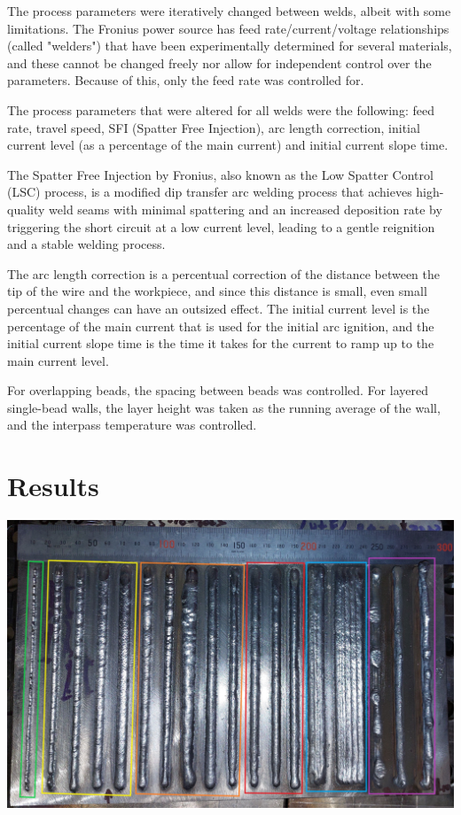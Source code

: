 The process parameters were iteratively changed between welds, albeit with some limitations. The Fronius power source has feed rate/current/voltage relationships (called "welders") that have been experimentally determined for several materials, and these cannot be changed freely nor allow for independent control over the parameters. Because of this, only the feed rate was controlled for.

The process parameters that were altered for all welds were the following: feed rate, travel speed, SFI (Spatter Free Injection), arc length correction, initial current level (as a percentage of the main current) and initial current slope time.

The Spatter Free Injection by Fronius, also known as the Low Spatter Control (LSC) process, is a modified dip transfer arc welding process that achieves high-quality weld seams with minimal spattering and an increased deposition rate by triggering the short circuit at a low current level, leading to a gentle reignition and a stable welding process.

The arc length correction is a percentual correction of the distance between the tip of the wire and the workpiece, and since this distance is small, even small percentual changes can have an outsized effect. The initial current level is the percentage of the main current that is used for the initial arc ignition, and the initial current slope time is the time it takes for the current to ramp up to the main current level.

For overlapping beads, the spacing between beads was controlled. For layered single-bead walls, the layer height was taken as the running average of the wall, and the interpass temperature was controlled.


\section{Results}

\begin{minipage}{\linewidth}
    \centering
    \includegraphics[width=\linewidth]{images/all_welds_boxes.jpg}
    \label{fig:all_welds}
\end{minipage}

